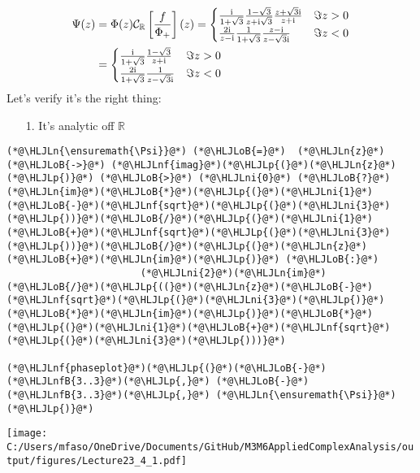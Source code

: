 \documentclass[12pt,a4paper]{article}
\newcommand{\HLJLn}[1]{#1}
\newcommand{\HLJLnf}[1]{\textcolor[RGB]{66,102,213}{#1}}
\newcommand{\HLJLnfB}[1]{\textcolor[RGB]{59,151,46}{#1}}
\newcommand{\HLJLni}[1]{\textcolor[RGB]{59,151,46}{#1}}
\newcommand{\HLJLoB}[1]{\textcolor[RGB]{102,102,102}{\textbf{#1}}}
\newcommand{\HLJLp}[1]{#1}
\def\I{ {\rm i} }
\def\R{ {\mathbb R} }
\def\CC{ {\cal C} }
\def\br[#1]{\left[{#1}\right]}
\begin{document}
\begin{align*}
\Psi(z)  &= \Phi(z) \CC_\R\br[{f \over \Phi_+}](z) = \begin{cases}
{\I \over 1+\sqrt 3} {1-\sqrt 3 \over z+ \I \sqrt{3}} {z+\sqrt{3}\I \over z+\I} & \Im z > 0 \\
{2 \I \over z-\I}{1 \over 1+ \sqrt{3}} {z-\I \over z-\sqrt{3}\I} & \Im z < 0
\end{cases} \\
    &= \begin{cases}
{\I \over 1+\sqrt 3} {1-\sqrt 3 \over z+\I} & \Im z > 0 \\
{2 \I  \over 1+ \sqrt{3}} {1 \over z-\sqrt{3}\I} & \Im z < 0
\end{cases}
\end{align*}
Let's verify it's the right thing:

\begin{itemize}
\item[1. ] It's analytic off $\R$

\end{itemize}

\begin{lstlisting}
(*@\HLJLn{\ensuremath{\Psi}}@*) (*@\HLJLoB{=}@*)  (*@\HLJLn{z}@*) (*@\HLJLoB{->}@*) (*@\HLJLnf{imag}@*)(*@\HLJLp{(}@*)(*@\HLJLn{z}@*)(*@\HLJLp{)}@*) (*@\HLJLoB{>}@*) (*@\HLJLni{0}@*) (*@\HLJLoB{?}@*) (*@\HLJLn{im}@*)(*@\HLJLoB{*}@*)(*@\HLJLp{(}@*)(*@\HLJLni{1}@*)(*@\HLJLoB{-}@*)(*@\HLJLnf{sqrt}@*)(*@\HLJLp{(}@*)(*@\HLJLni{3}@*)(*@\HLJLp{))}@*)(*@\HLJLoB{/}@*)(*@\HLJLp{(}@*)(*@\HLJLni{1}@*)(*@\HLJLoB{+}@*)(*@\HLJLnf{sqrt}@*)(*@\HLJLp{(}@*)(*@\HLJLni{3}@*)(*@\HLJLp{))}@*)(*@\HLJLoB{/}@*)(*@\HLJLp{(}@*)(*@\HLJLn{z}@*)(*@\HLJLoB{+}@*)(*@\HLJLn{im}@*)(*@\HLJLp{)}@*) (*@\HLJLoB{:}@*)
                       (*@\HLJLni{2}@*)(*@\HLJLn{im}@*)(*@\HLJLoB{/}@*)(*@\HLJLp{((}@*)(*@\HLJLn{z}@*)(*@\HLJLoB{-}@*)(*@\HLJLnf{sqrt}@*)(*@\HLJLp{(}@*)(*@\HLJLni{3}@*)(*@\HLJLp{)}@*)(*@\HLJLoB{*}@*)(*@\HLJLn{im}@*)(*@\HLJLp{)}@*)(*@\HLJLoB{*}@*)(*@\HLJLp{(}@*)(*@\HLJLni{1}@*)(*@\HLJLoB{+}@*)(*@\HLJLnf{sqrt}@*)(*@\HLJLp{(}@*)(*@\HLJLni{3}@*)(*@\HLJLp{)))}@*)

(*@\HLJLnf{phaseplot}@*)(*@\HLJLp{(}@*)(*@\HLJLoB{-}@*)(*@\HLJLnfB{3..3}@*)(*@\HLJLp{,}@*) (*@\HLJLoB{-}@*)(*@\HLJLnfB{3..3}@*)(*@\HLJLp{,}@*) (*@\HLJLn{\ensuremath{\Psi}}@*)(*@\HLJLp{)}@*)
\end{lstlisting}

\texttt{[image: C:/Users/mfaso/OneDrive/Documents/GitHub/M3M6AppliedComplexAnalysis/output/figures/Lecture23\_4\_1.pdf]}
\end{document}

